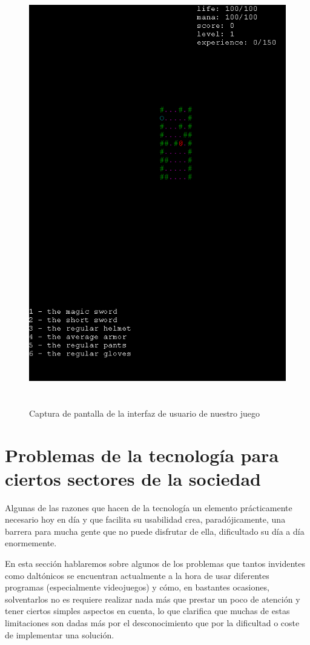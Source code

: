 \begin{figure}[H]
		\includegraphics[width=140mm, height=185mm]{./img/roomsGameGeneral.png}
	\caption{Captura de pantalla de la interfaz de usuario de nuestro juego}
	\label{fig:roomsgamegeneral}
\end{figure}

\section{Problemas de la tecnología para ciertos sectores de la sociedad}
\label{sec:dificultadesfeedback}

Algunas de las razones que hacen de la tecnología un elemento prácticamente necesario hoy en día y que facilita su usabilidad crea, paradójicamente, una barrera para mucha gente que no puede disfrutar de ella, dificultado su día a día enormemente.

En esta sección hablaremos sobre algunos de los problemas que tantos invidentes como daltónicos se encuentran actualmente a la hora de usar diferentes programas (especialmente videojuegos) y cómo, en bastantes ocasiones, solventarlos no es requiere realizar nada más que prestar un poco de atención y tener ciertos simples aspectos en cuenta, lo que clarifica que muchas de estas limitaciones son dadas más por el desconocimiento que por la dificultad o coste de implementar una solución.

